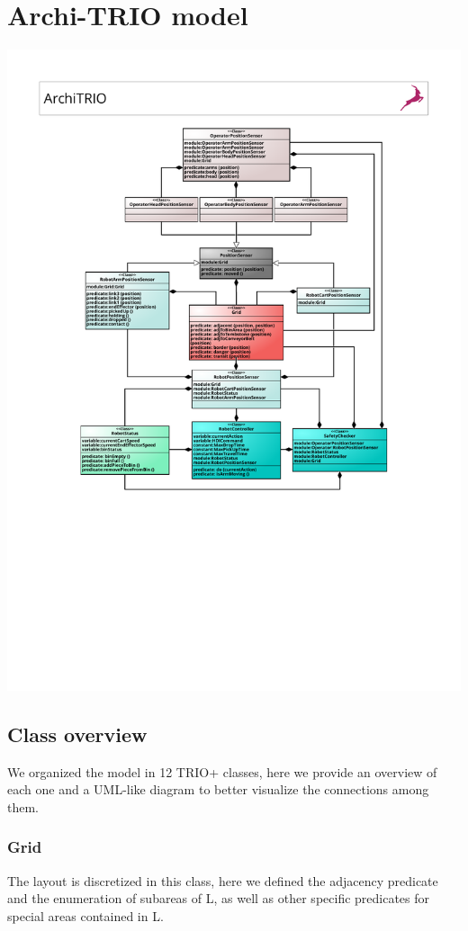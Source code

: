 \documentclass[a4paper]{article}
\begin{document}
\clearpage
\section{Archi-TRIO model}
\begin{center}
    \includegraphics[width=17cm]{images/archiTRIOmodified}
\end{center}

\subsection{Class overview}
We organized the model in 12 TRIO+ classes, here we provide an overview of each one and a UML-like diagram to better visualize the connections among them.

\subsubsection{Grid}
The layout is discretized in this class, here we defined the adjacency predicate and the enumeration of subareas of L, as well as other specific predicates for special areas contained in L.
\end{document}
